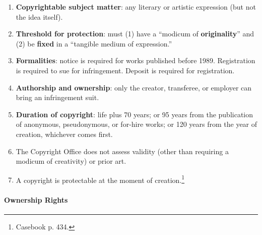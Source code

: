 \begin{enumerate}
    \item \textbf{Copyrightable subject matter}: any literary or artistic 
    expression (but not the idea itself).
    \item \textbf{Threshold for protection}: must (1) have a ``modicum of 
    \textbf{originality}'' and (2) be \textbf{fixed} in a ``tangible medium of 
    expression.''
    \item \textbf{Formalities}: notice is required for works published before 
    1989. Registration is required to sue for infringement. Deposit is 
    required for registration.
    \item \textbf{Authorship and ownership}: only the creator, transferee, or 
    employer can bring an infringement suit.
    \item \textbf{Duration of copyright}: life plus 70 years; or 95 years from 
    the publication of anonymous, pseudonymous, or for-hire works; or 120 
    years from the year of creation, whichever comes first.
    \item The Copyright Office does not assess validity (other than requiring 
    a modicum of creativity) or prior art.
    \item A copyright is protectable at the moment of 
    creation.\footnote{Casebook p. 434.}
\end{enumerate}

\paragraph{Ownership Rights}

